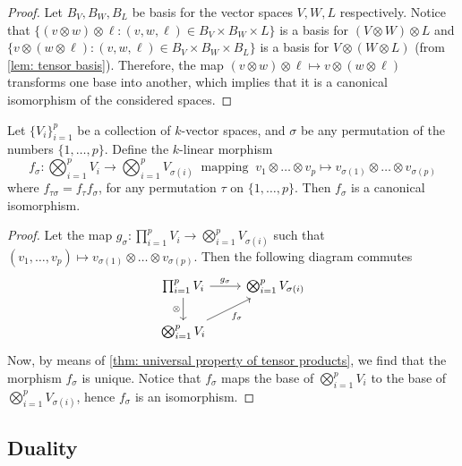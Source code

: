 \begin{proof}
    Let \(B_V, B_W, B_L\) be basis for the vector spaces \(V, W, L\) respectively.
    Notice that \(\{(v \otimes w) \otimes \ell \colon (v, w, \ell) \in B_V \times B_W
    \times L\}\) is a basis for \((V \otimes W) \otimes L\) and \(\{v \otimes (w
    \otimes \ell) \colon (v, w, \ell) \in B_V \times B_W \times B_L\}\) is a basis for
    \(V \otimes (W \otimes L)\) (from \cref{lem: tensor basis}). Therefore, the
    map \((v \otimes w) \otimes \ell \mapsto v \otimes (w \otimes \ell)\)
    transforms one base into another, which implies that it is a canonical
    isomorphism of the considered spaces.
\end{proof}

\begin{proposition}[Commutativity]\label{prop: commutativity tensor prod}
    Let \(\{V_i\}_{i=1}^p\) be a collection of \(k\)-vector spaces, and \(\sigma\)
    be any permutation of the numbers \(\{1, \dots, p\}\). Define the \(k\)-linear
    morphism
    \[
        f_\sigma : \bigotimes_{i=1}^p V_i \to \bigotimes_{i=1}^p V_{\sigma(i)}\
        \text{ mapping }\ v_1 \otimes \dots \otimes v_p \mapsto v_{\sigma(1)}
        \otimes \dots \otimes v_{\sigma(p)}
    \]
    where \(f_{\tau\sigma} = f_\tau f_\sigma\), for any permutation \(\tau\)
    on \(\{1, \dots, p\}\). Then \(f_\sigma\) is a canonical isomorphism.
\end{proposition}

\begin{proof}
    Let the map \(g_\sigma: \prod_{i=1}^p V_i \to \bigotimes_{i=1}^p
    V_{\sigma(i)}\) such that \((v_1, \dots, v_p) \mapsto v_{\sigma(1)} \otimes
    \dots \otimes v_{\sigma(p)}\). Then the following diagram commutes
    \[
        \begin{tikzcd}
            \prod_{i=1}^p V_i \ar[r, "g_\sigma"] \ar[d, swap, "\otimes"]
            &\bigotimes_{i=1}^p V_{\sigma(i)}\\
            \bigotimes_{i=1}^p V_i \ar[ur, swap, "f_\sigma"]
        \end{tikzcd}
    \]
    Now, by means of \cref{thm: universal property of tensor products}, we find
    that the morphism \(f_\sigma\) is unique. Notice that \(f_\sigma\) maps the
    base of \(\bigotimes_{i=1}^p V_i\) to the base of \(\bigotimes_{i=1}^p
    V_{\sigma(i)}\), hence \(f_\sigma\) is an isomorphism.
\end{proof}

\subsection{Duality}

